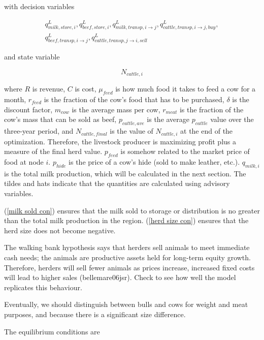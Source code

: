 \documentclass[letter,12pt]{article}
\begin{document}
\noindent with decision variables

\begin{align}
q_{milk,store,i}^L,q_{beef,store,i}^L,q_{milk,transp,i \rightarrow j}^L,q_{cattle,transp,i \rightarrow j,buy}^L, \nonumber \\
q_{beef,transp,i \rightarrow j}^L,q_{cattle,transp,j \rightarrow i,sell}^L
\end{align}

\noindent and state variable

\begin{equation}
N_{cattle,i}
\end{equation}

\noindent where $R$ is revenue, $C$ is cost, $\mu_{feed}$ is how much food it takes to feed a cow for a month, $r_{feed}$ is the fraction of the cow's food that has to be purchased, $\delta$ is the discount factor, $m_{cow}$ is the average mass per cow, $r_{meat}$ is the fraction of the cow's mass that can be sold as beef, $p_{cattle,ave}$ is the average $p_{cattle}$ value over the three-year period, and $N_{cattle,final}$ is the value of $N_{cattle,i}$ at the end of the optimization.  Therefore, the livestock producer is maximizing profit plus a measure of the final herd value.  $p_{feed}$ is somehow related to the market price of food at node $i$.  $p_{hide}$ is the price of a cow's hide (sold to make leather, etc.).  $q_{milk,i}$ is the total milk production, which will be calculated in the next section.  The tildes and hats indicate that the quantities are calculated using advisory variables.  

(\ref{milk sold con}) ensures that the milk sold to storage or distribution is no greater than the total milk production in the region.  (\ref{herd size con}) ensures that the herd size does not become negative.

The walking bank hypothesis says that herders sell animals to meet immediate cash needs; the animals are productive assets held for long-term equity growth.  Therefore, herders will sell fewer animals as prices increase, increased fixed costs will lead to higher sales (bellemare06jsr).  Check to see how well the model replicates this behaviour.

Eventually, we should distinguish between bulls and cows for weight and meat purposes, and because there is a significant size difference.

The equilibrium conditions are
\end{document}
